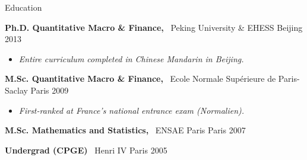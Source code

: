 \documentclass[usegeometry, 10pt, a4paper]{cv} %
\newcommand{\activite}[1]{\textbf{#1}\ }
\begin{document}
\begin{rubriquetableau}[0.95\textwidth]{Education}\\
  \vspace{-0.5cm}
  
  \activite{Ph.D. Quantitative Macro \& Finance,} Peking University \& EHESS \hfill Beijing 2013\\ 
\vspace{-0.5cm}  
  \begin{itemize}[label={},
    rightmargin=\dimexpr\linewidth-13cm-\leftmargin\relax]
  \item \small{\emph{Entire curriculum completed in Chinese Mandarin in Beijing.}}
  \end{itemize}
  
  \vspace{0.2cm}
  
  \activite{M.Sc. Quantitative Macro \& Finance,} Ecole Normale Supérieure de Paris-Saclay \hfill Paris 2009\\
  \vspace{-0.5cm}
  \begin{itemize}[label={}, rightmargin=\dimexpr\linewidth-13cm-\leftmargin\relax]
  \item \small{\emph{First-ranked at France's national entrance exam (Normalien).}}
  \end{itemize}

  \vspace{0.2cm}


  \activite{M.Sc. Mathematics and Statistics,} ENSAE Paris \hfill Paris 2007\\
  \vspace{0.2cm}

  \activite{Undergrad (CPGE)} Henri IV \hfill Paris 2005\\
  \end{rubriquetableau}

\newpage

\end{document}
